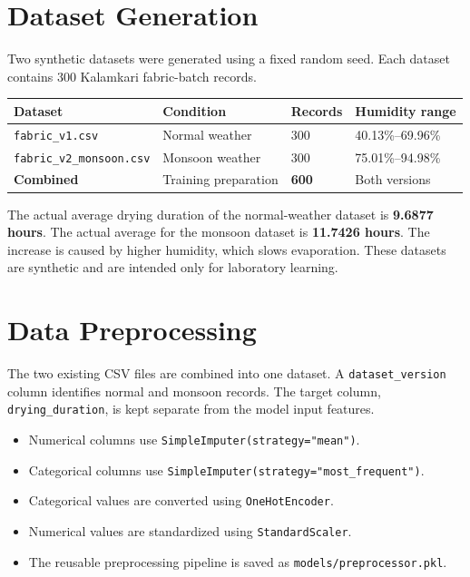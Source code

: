 \documentclass[12pt,a4paper]{article}
\begin{document}
\section{Dataset Generation}
Two synthetic datasets were generated using a fixed random seed. Each dataset contains 300 Kalamkari fabric-batch records.

\begin{longtable}{p{}p{}p{}p{}}
\toprule
\textbf{Dataset} & \textbf{Condition} & \textbf{Records} & \textbf{Humidity range} \\
\midrule
\texttt{fabric\_v1.csv} & Normal weather & 300 & 40.13\%--69.96\% \\
\texttt{fabric\_v2\_monsoon.csv} & Monsoon weather & 300 & 75.01\%--94.98\% \\
\textbf{Combined} & Training preparation & \textbf{600} & Both versions \\
\bottomrule
\end{longtable}

The actual average drying duration of the normal-weather dataset is
\textbf{9.6877 hours}. The actual average for the monsoon dataset is
\textbf{11.7426 hours}. The increase is caused by higher humidity, which slows evaporation. These datasets are synthetic and are intended only for laboratory learning.

\section{Data Preprocessing}
The two existing CSV files are combined into one dataset. A \texttt{dataset\_version} column identifies normal and monsoon records. The target column, \texttt{drying\_duration}, is kept separate from the model input features.

\begin{itemize}[leftmargin=*]
    \item Numerical columns use \texttt{SimpleImputer(strategy="mean")}.
    \item Categorical columns use \texttt{SimpleImputer(strategy="most\_frequent")}.
    \item Categorical values are converted using \texttt{OneHotEncoder}.
    \item Numerical values are standardized using \texttt{StandardScaler}.
    \item The reusable preprocessing pipeline is saved as \texttt{models/preprocessor.pkl}.
\end{itemize}
\end{document}
